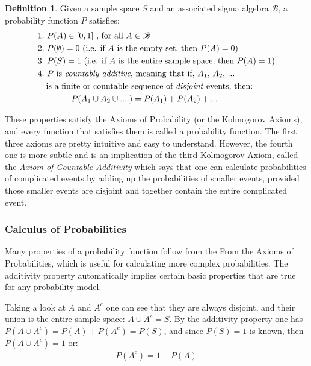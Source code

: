 \documentclass[
  oneside,
  11pt, a4paper,
  footinclude=true,
  headinclude=true,
  cleardoublepage=empty
]{scrbook}
\theoremstyle{definition}
\newtheorem{definition}{Definition}[section]
\theoremstyle{definition}
\begin{document}
                \begin{definition}{Given a sample space $S$ and an associated sigma algebra $\mathscr{B}$, a probability function $P$ satisfies:}
                \begin{align*}
                & 1.\ P(A) \in [0, 1]\ \text{, for all}\ A \in \mathscr{B} \\
                & 2.\ P(\emptyset) = 0\ \text{(i.e. if $A$ is the empty set, then $P(A) = 0$)} \\
                & 3.\ P(S) = 1\ \text{(i.e. if $A$ is the entire sample space, then $P(A) = 1$)} \\
                & 4.\ \text{$P$ is \emph{countably additive}, meaning that if, $A_1$, $A_2$, ...} \\ 
                & \quad \text{is a finite or countable sequence of \emph{disjoint} events, then:}\\
                & \qquad\qquad P(A_1 \cup A_2 \cup ....) = P(A_1) + P(A_2) + \text{...} 
                \end{align*}{}
                \end{definition}{}
                
                These properties satisfy the Axioms of Probability (or the Kolmogorov Axioms), and every function that satisfies them is called a probability function. The first three axioms are pretty intuitive and easy to understand. However, the fourth one is more subtle and is an implication of the third Kolmogorov Axiom, called the \emph{Axiom of Countable Additivity} which says that one can calculate probabilities of complicated events by adding up the probabilities of smaller events, provided those smaller events are disjoint and together contain the entire complicated event.
        
        \subsubsection{Calculus of Probabilities}
            
            Many properties of a probability function follow from the From the Axioms of Probabilities, which is
            useful for calculating more complex probabilities. The additivity property automatically implies certain basic properties that are true for any probability model.
            
            Taking a look at $A$ and $A^c$ one can see that they are always disjoint, and their union is the entire sample space: $A \cup A^c = S$. By the additivity property one has $P(A \cup A^c) = P(A) + P(A^c) = P(S)$, and since $P(S) = 1$ is known, then $P(A \cup A^c) = 1$ or:
            \begin{align}
                P(A^c) = 1 - P(A)
            \end{align}{}
            
\end{document}
